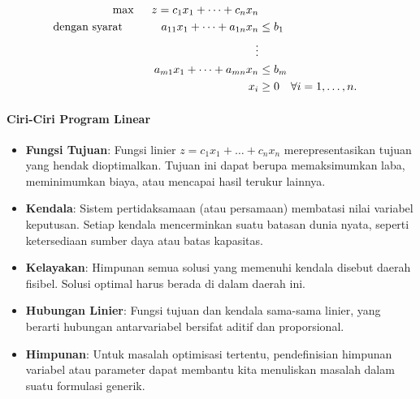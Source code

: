 \begin{equation}
\begin{aligned}
\max\;\;&& z = c_1x_1 + \dots + c_nx_n \\
\mbox{dengan syarat}\quad\;\;&& a_{11}x_1 + \dots + a_{1n}x_n &\leq b_1 \\
&& \hspace*{0.5in}\vdots \\
&& a_{m1}x_1 + \dots + a_{mn}x_n &\leq b_m \\
&& x_i &\geq 0 \quad \forall i=1, \dots, n.
\end{aligned}
\label{eqn:GeneralLPMax}
\end{equation}

\paragraph{Ciri-Ciri Program Linear}

\begin{itemize}
    \item \textbf{Fungsi Tujuan}: Fungsi linier $z = c_1x_1 + \dots + c_nx_n$ merepresentasikan tujuan yang hendak dioptimalkan. Tujuan ini dapat berupa memaksimumkan laba, meminimumkan biaya, atau mencapai hasil terukur lainnya.
    \item \textbf{Kendala}: Sistem pertidaksamaan (atau persamaan) membatasi nilai variabel keputusan. Setiap kendala mencerminkan suatu batasan dunia nyata, seperti ketersediaan sumber daya atau batas kapasitas.
    \item \textbf{Kelayakan}: Himpunan semua solusi yang memenuhi kendala disebut daerah fisibel. Solusi optimal harus berada di dalam daerah ini.
    \item \textbf{Hubungan Linier}: Fungsi tujuan dan kendala sama-sama linier, yang berarti hubungan antarvariabel bersifat aditif dan proporsional.
    \item \textbf{Himpunan}: Untuk masalah optimisasi tertentu, pendefinisian himpunan variabel atau parameter dapat membantu kita menuliskan masalah dalam suatu formulasi generik.
\end{itemize}

